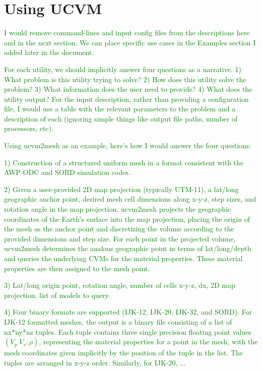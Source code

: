 
\section{Using UCVM}

\textcolor{green}{I would remove command-lines and input config files from the descriptions here and in the next section. We can place specific use cases in the Examples section I added later in the document.}

\textcolor{green}{For each utility, we should implicitly answer four questions as a narrative. 1) What problem is this utility trying to solve? 2) How does this utility solve the problem? 3) What information does the user need to provide? 4) What does the utility output? For the input description, rather than providing a configuration file, I would use a table with the relevant parameters to the problem and a description of each (ignoring simple things like output file paths, number of processors, etc).}

\textcolor{green}{Using ucvm2mesh as an example, here's how I would answer the four questions:}

\textcolor{green}{1) Construction of a structured uniform mesh in a format consistent with the AWP-ODC and SORD simulation codes. }

\textcolor{green}{2) Given a user-provided 2D map projection (typically UTM-11), a lat/long geographic anchor point, desired mesh cell dimensions along x-y-z, step sizes, and rotation angle in the map projection, ucvm2mesh projects the geographic coordinates of the Earth's surface into the map projection, placing the origin of the mesh as the anchor point and discretizing the volume according to the provided dimensions and step size. For each point in the projected volume, ucvm2mesh determines the analous geographic point in terms of lat/long/depth and queries the underlying CVMs for the material properties. These material properties are then assigned to the mesh point. }

\textcolor{green}{3) Lat/long origin point, rotation angle, number of cells x-y-z, dx, 2D map projection, list of models to query. }

\textcolor{green}{4) Four binary formats are supported (IJK-12, IJK-20, IJK-32, and SORD). For IJK-12 formatted meshes, the output is a binary file consisting of a list of nx*ny*nz tuples. Each tuple contains three single precision floating point values $(V_p. V_s, \rho)$, representing the material properties for a point in the mesh, with the mesh coordinates given implicitly by the position of the tuple in the list. The tuples are arranged in x-y-z order. Similarly, for IJK-20, ...}


